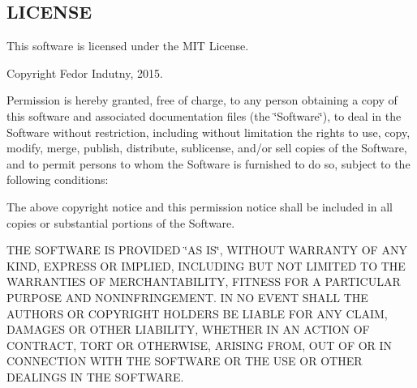 \subsection*{L\+I\+C\+E\+N\+SE}

This software is licensed under the M\+IT License.

Copyright Fedor Indutny, 2015.

Permission is hereby granted, free of charge, to any person obtaining a copy of this software and associated documentation files (the \char`\"{}\+Software\char`\"{}), to deal in the Software without restriction, including without limitation the rights to use, copy, modify, merge, publish, distribute, sublicense, and/or sell copies of the Software, and to permit persons to whom the Software is furnished to do so, subject to the following conditions\+:

The above copyright notice and this permission notice shall be included in all copies or substantial portions of the Software.

T\+HE S\+O\+F\+T\+W\+A\+RE IS P\+R\+O\+V\+I\+D\+ED \char`\"{}\+A\+S I\+S\char`\"{}, W\+I\+T\+H\+O\+UT W\+A\+R\+R\+A\+N\+TY OF A\+NY K\+I\+ND, E\+X\+P\+R\+E\+SS OR I\+M\+P\+L\+I\+ED, I\+N\+C\+L\+U\+D\+I\+NG B\+UT N\+OT L\+I\+M\+I\+T\+ED TO T\+HE W\+A\+R\+R\+A\+N\+T\+I\+ES OF M\+E\+R\+C\+H\+A\+N\+T\+A\+B\+I\+L\+I\+TY, F\+I\+T\+N\+E\+SS F\+OR A P\+A\+R\+T\+I\+C\+U\+L\+AR P\+U\+R\+P\+O\+SE A\+ND N\+O\+N\+I\+N\+F\+R\+I\+N\+G\+E\+M\+E\+NT. IN NO E\+V\+E\+NT S\+H\+A\+LL T\+HE A\+U\+T\+H\+O\+RS OR C\+O\+P\+Y\+R\+I\+G\+HT H\+O\+L\+D\+E\+RS BE L\+I\+A\+B\+LE F\+OR A\+NY C\+L\+A\+IM, D\+A\+M\+A\+G\+ES OR O\+T\+H\+ER L\+I\+A\+B\+I\+L\+I\+TY, W\+H\+E\+T\+H\+ER IN AN A\+C\+T\+I\+ON OF C\+O\+N\+T\+R\+A\+CT, T\+O\+RT OR O\+T\+H\+E\+R\+W\+I\+SE, A\+R\+I\+S\+I\+NG F\+R\+OM, O\+UT OF OR IN C\+O\+N\+N\+E\+C\+T\+I\+ON W\+I\+TH T\+HE S\+O\+F\+T\+W\+A\+RE OR T\+HE U\+SE OR O\+T\+H\+ER D\+E\+A\+L\+I\+N\+GS IN T\+HE S\+O\+F\+T\+W\+A\+RE. 
